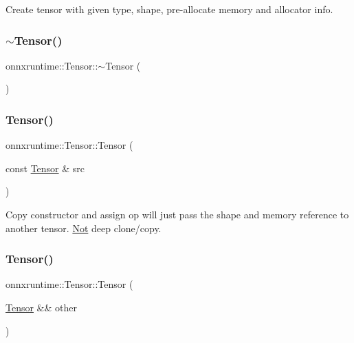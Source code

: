 Create tensor with given type, shape, pre-\/allocate memory and allocator info. \mbox{\label{classonnxruntime_1_1Tensor_af1c76fd7465e7d8297c8a285dd4e9cc2}} 
\subsubsection{\texorpdfstring{$\sim$\+Tensor()}{~Tensor()}}
{\footnotesize\ttfamily onnxruntime\+::\+Tensor\+::$\sim$\+Tensor (\begin{DoxyParamCaption}{ }\end{DoxyParamCaption})}

\mbox{\label{classonnxruntime_1_1Tensor_ad812cddaf6bb36cbe9259940acc26567}} 
\subsubsection{\texorpdfstring{Tensor()}{Tensor()}\hspace{0.1cm}{\footnotesize\ttfamily [2/3]}}
{\footnotesize\ttfamily onnxruntime\+::\+Tensor\+::\+Tensor (\begin{DoxyParamCaption}\item[{const \mbox{\hyperlink{classonnxruntime_1_1Tensor}{Tensor}} \&}]{src }\end{DoxyParamCaption})}

Copy constructor and assign op will just pass the shape and memory reference to another tensor. \mbox{\hyperlink{classonnxruntime_1_1Not}{Not}} deep clone/copy. \mbox{\label{classonnxruntime_1_1Tensor_a7ba43380aa69742136752e11b38c927a}} 
\subsubsection{\texorpdfstring{Tensor()}{Tensor()}\hspace{0.1cm}{\footnotesize\ttfamily [3/3]}}
{\footnotesize\ttfamily onnxruntime\+::\+Tensor\+::\+Tensor (\begin{DoxyParamCaption}\item[{\mbox{\hyperlink{classonnxruntime_1_1Tensor}{Tensor}} \&\&}]{other }\end{DoxyParamCaption})}



